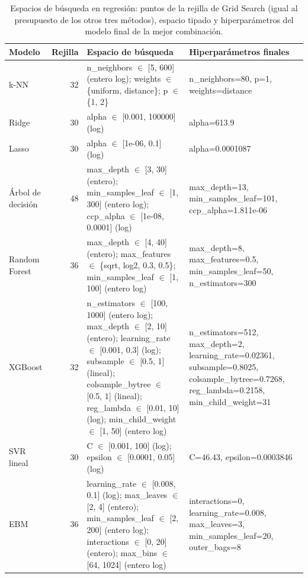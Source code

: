 \begin{table}[htbp]
\caption{Espacios de búsqueda en regresión: puntos de la rejilla de Grid Search (igual al presupuesto de los otros tres métodos), espacio tipado y hiperparámetros del modelo final de la mejor combinación.}\label{tab:espacios_regresion}
\tiny\setlength{\tabcolsep}{2pt}
\begin{tabular}{lr>{\raggedright\arraybackslash}p{4.7cm}>{\raggedright\arraybackslash}p{3.3cm}}
\toprule
\textbf{Modelo} & \textbf{Rejilla} & \textbf{Espacio de búsqueda} & \textbf{Hiperparámetros finales} \\
\midrule
k-NN & 32 & n\_neighbors $\in$ [5, 600] (entero log); weights $\in$ \{uniform, distance\}; p $\in$ \{1, 2\} & n\_neighbors=80, p=1, weights=distance \\
Ridge & 30 & alpha $\in$ [0.001, 100000] (log) & alpha=613.9 \\
Lasso & 30 & alpha $\in$ [1e-06, 0.1] (log) & alpha=0.0001087 \\
Árbol de decisión & 48 & max\_depth $\in$ [3, 30] (entero); min\_samples\_leaf $\in$ [1, 300] (entero log); ccp\_alpha $\in$ [1e-08, 0.0001] (log) & max\_depth=13, min\_samples\_leaf=101, ccp\_alpha=1.811e-06 \\
Random Forest & 36 & max\_depth $\in$ [4, 40] (entero); max\_features $\in$ \{sqrt, log2, 0.3, 0.5\}; min\_samples\_leaf $\in$ [1, 100] (entero log) & max\_depth=8, max\_features=0.5, min\_samples\_leaf=50, n\_estimators=300 \\
XGBoost & 32 & n\_estimators $\in$ [100, 1000] (entero log); max\_depth $\in$ [2, 10] (entero); learning\_rate $\in$ [0.001, 0.3] (log); subsample $\in$ [0.5, 1] (lineal); colsample\_bytree $\in$ [0.5, 1] (lineal); reg\_lambda $\in$ [0.01, 10] (log); min\_child\_weight $\in$ [1, 50] (entero log) & n\_estimators=512, max\_depth=2, learning\_rate=0.02361, subsample=0.8025, colsample\_bytree=0.7268, reg\_lambda=0.2158, min\_child\_weight=31 \\
SVR lineal & 30 & C $\in$ [0.001, 100] (log); epsilon $\in$ [0.0001, 0.05] (log) & C=46.43, epsilon=0.0003846 \\
EBM & 36 & learning\_rate $\in$ [0.008, 0.1] (log); max\_leaves $\in$ [2, 4] (entero); min\_samples\_leaf $\in$ [2, 200] (entero log); interactions $\in$ [0, 20] (entero); max\_bins $\in$ [64, 1024] (entero log) & interactions=0, learning\_rate=0.008, max\_leaves=3, min\_samples\_leaf=20, outer\_bags=8 \\
\bottomrule
\end{tabular}
\end{table}
